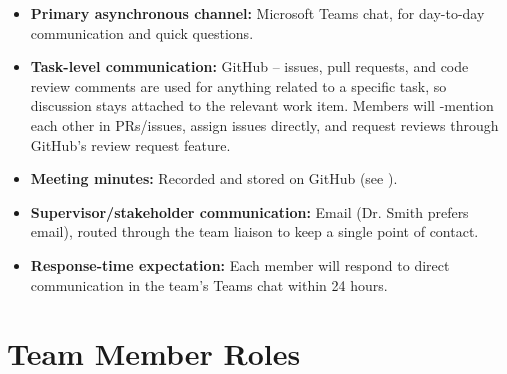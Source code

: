 \documentclass{article}
\begin{document}
\begin{itemize}
    \item \textbf{Primary asynchronous channel:} Microsoft Teams chat, for day-to-day communication and quick questions.
    \item \textbf{Task-level communication:} GitHub -- issues, pull requests, and code review comments are used for anything related to a specific task, so discussion stays attached to the relevant work item. Members will \@-mention each other in PRs/issues, assign issues directly, and request reviews through GitHub's review request feature.
    \item \textbf{Meeting minutes:} Recorded and stored on GitHub (see ).
    \item \textbf{Supervisor/stakeholder communication:} Email (Dr. Smith prefers email), routed through the team liaison to keep a single point of contact.
    \item \textbf{Response-time expectation:} Each member will respond to direct communication in the team's Teams chat within 24 hours.
\end{itemize}

\section{Team Member Roles}

\label{sec:team-member}

\end{document}
